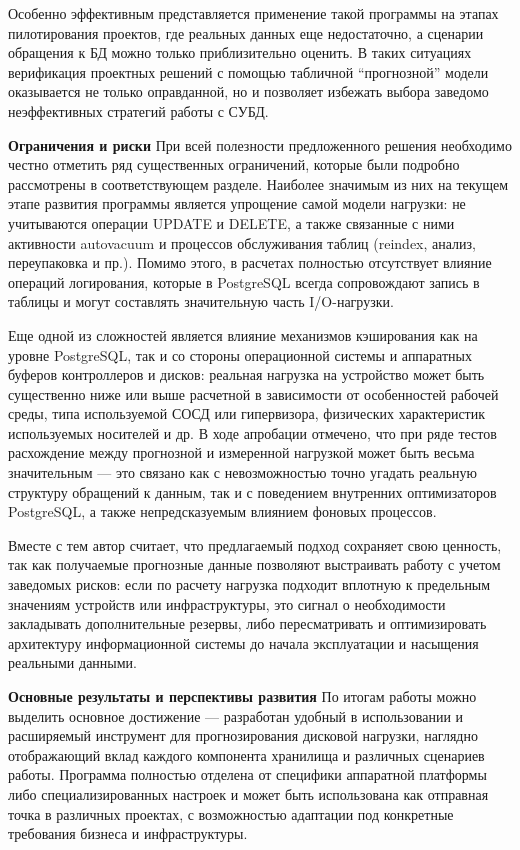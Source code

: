 Особенно эффективным представляется применение такой программы на этапах пилотирования проектов, где реальных данных 
еще недостаточно, а сценарии обращения к БД можно только приблизительно оценить. В таких ситуациях верификация 
проектных решений с помощью табличной “прогнозной” модели оказывается не только оправданной, но и позволяет избежать 
выбора заведомо неэффективных стратегий работы с СУБД.

\textbf{Ограничения и риски}
При всей полезности предложенного решения необходимо честно отметить ряд существенных ограничений, которые были 
подробно рассмотрены в соответствующем разделе. Наиболее значимым из них на текущем этапе развития программы является 
упрощение самой модели нагрузки: не учитываются операции UPDATE и DELETE, а также связанные с ними активности 
autovacuum и процессов обслуживания таблиц (reindex, анализ, переупаковка и пр.). Помимо этого, в расчетах полностью 
отсутствует влияние операций логирования, которые в PostgreSQL всегда сопровождают запись в таблицы и могут составлять 
значительную часть I/O-нагрузки.

Еще одной из сложностей является влияние механизмов кэширования как на уровне PostgreSQL, так и со стороны операционной 
системы и аппаратных буферов контроллеров и дисков: реальная нагрузка на устройство может быть существенно ниже или 
выше расчетной в зависимости от особенностей рабочей среды, типа используемой СОСД или гипервизора, физических 
характеристик используемых носителей и др. 
В ходе апробации отмечено, что при ряде тестов расхождение между прогнозной и измеренной нагрузкой может быть весьма 
значительным — это связано как с невозможностью точно угадать реальную структуру обращений к данным, так и с 
поведением внутренних оптимизаторов PostgreSQL, а также непредсказуемым влиянием фоновых процессов.

Вместе с тем автор считает, что предлагаемый подход сохраняет свою ценность, так как получаемые прогнозные данные 
позволяют выстраивать работу с учетом заведомых рисков: если по расчету нагрузка подходит вплотную к предельным 
значениям устройств или инфраструктуры, это сигнал о необходимости закладывать дополнительные резервы, либо 
пересматривать и оптимизировать архитектуру информационной системы до начала эксплуатации и насыщения реальными данными.

\textbf{Основные результаты и перспективы развития}
По итогам работы можно выделить основное достижение — разработан удобный в использовании и расширяемый инструмент 
для прогнозирования дисковой нагрузки, наглядно отображающий вклад каждого компонента хранилища и 
различных сценариев работы. Программа полностью отделена от специфики аппаратной платформы либо специализированных 
настроек и может быть использована как отправная точка в различных проектах, с возможностью адаптации под конкретные 
требования бизнеса и инфраструктуры.

